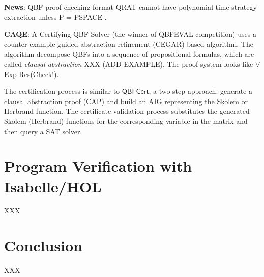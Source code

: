 \documentclass[runningheads]{llncs}
\newcommand{\qrpcert}{\mathsf{QBFCert}}
\newcommand{\0}{0}
\newcommand{\1}{1}
\def\faexp{$\forall$\textsf{Exp-Res}\xspace}
\begin{document}
\vspace{0.2cm}
\noindent\textbf{News}:  QBF proof checking format QRAT cannot have polynomial time strategy extraction unless P = PSPACE \cite{ChewC20}.

\vspace{0.3cm}
\noindent\textbf{CAQE}: A Certifying QBF Solver \cite{RabeT15} (the winner of QBFEVAL competition) uses a counter-example guided abstraction refinement (CEGAR)-based algorithm. The algorithm decompose QBFs into a sequence of propositional formulas, which are called \textit{clausal abstraction} XXX (ADD EXAMPLE). The proof system looks like \faexp (Check!).

The certification process is similar to $\qrpcert$, a two-step approach: generate a clausal abstraction proof (CAP) and build an AIG representing the Skolem or Herbrand function. The certificate validation process substitutes the generated Skolem (Herbrand) functions for the corresponding variable in the matrix and then query a SAT solver.

\section{Program Verification with Isabelle/HOL} \label{sec:Isabelle}

XXX

\section{Conclusion} \label{sec:conclusion}

XXX



%

\end{document}
